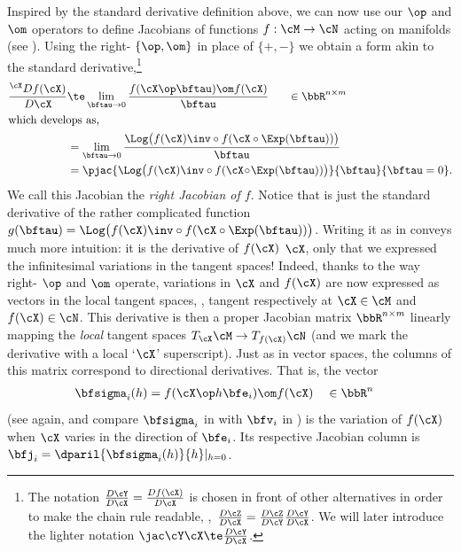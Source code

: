 Inspired by the standard derivative definition  above, we can now use our $\op$ and $\om$ operators to define Jacobians of functions $f:\cM\to\cN$ acting on manifolds (see ).
Using the right- $\{\op,\om\}$ in place of $\{+,-\}$ we obtain a form akin to the standard derivative,\footnote{%
The notation $\ndpar{\cY}{\cX}=\ndpar{f(\cX)}{\cX}$ is chosen in front of other alternatives in order to make the chain rule readable, \ie,~$\ndpar{\cZ}{\cX}=\ndpar{\cZ}{\cY}\ndpar{\cY}{\cX}$.
We will later introduce the lighter notation $\mjac{\cY}{\cX}\te\ndpar{\cY}{\cX}$.
}
%
\begin{subequations}\label{equ:Jacobian_set}
\begin{align}
\rdpar{f(\cX)}{\cX}
&\te \lim_{\bftau\to0}\frac{f(\cX\op\bftau)\om f(\cX)}{\bftau}
~~~~~ \in\bbR^{n\times m} \label{equ:Jacobian} 
\\
\intertext{which develops as,}
& = \lim_{\bftau\to0}\frac{\Log\big(f(\cX)\inv\circ f(\cX\circ\Exp(\bftau)) \big)}{\bftau} 
\\
&= \pjac{\Log\big(f(\cX)\inv\circ f(\cX\!\circ\!\Exp(\bftau)) \big)}{\bftau}{\bftau=0} 
 \label{equ:Jacobian_aslinear}
.
\end{align}
\end{subequations}
%
We call this Jacobian the \emph{right Jacobian of $f$}.
Notice that  is just the standard derivative  of the rather complicated function $g(\bftau)=\Log\big(f(\cX)\inv\circ f(\cX\circ\Exp(\bftau)) \big)$. 
Writing it as in  conveys much more intuition: it is the derivative of $f(\cX)$ \wrt $\cX$, only that we expressed the infinitesimal variations in the tangent spaces!
Indeed, thanks to the way right- $\op$ and $\om$ operate, variations in $\cX$ and $f(\cX)$ are now expressed as vectors in the local tangent spaces, \ie, tangent respectively at $\cX\in\cM$ and $f(\cX)\in\cN$. 
This derivative is then a proper Jacobian matrix $\bbR^{n\times m}$ linearly mapping the \emph{local} tangent spaces $\mtanat{\cM}{\cX} \to \mtanat{\cN}{f(\cX)}$ (and we mark the derivative with a local `$\cX$' superscript).
Just as in vector spaces, the columns of this matrix correspond to directional derivatives.
That is, the vector 
%
\begin{align}
\bfsigma_i(h) &= f(\cX\op h\bfe_i)\om f(\cX) \quad \in\bbR^n \label{equ:jac_N_vec}
\end{align}
%
(see  again, and compare $\bfsigma_i$ in  with $\bfv_i$ in )
is the variation of $f(\cX)$ when $\cX$ varies in the direction of $\bfe_i$.
Its respective Jacobian column is $\bfj_i=\dparil{\bfsigma_i(h)}{h}|_{h=0}$.



